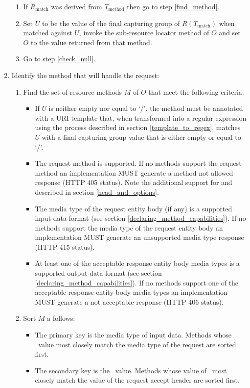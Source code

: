 \begin{enumerate}
\begin{enumerate}
\item If $R_{\mbox{match}}$ was derived from $T_{\mbox{method}}$ then go to step \ref{find_method}.

\item Set $U$ to be the value of the final capturing group of $R(T_{\mbox{match}})$ when matched against $U$,  invoke the sub-resource locator method of $O$ and set $O$ to the value returned from that method.

\item Go to step \ref{check_null}.

\end{enumerate}

\item \label{find_method} Identify the method that will handle the request:

\begin{enumerate}
\item Find the set of resource methods $M$ of $O$ that meet the following criteria:
\begin{itemize}
\item If $U$ is neither empty nor equal to \lq/\rq, the method must be annotated with  a URI template that, when transformed into a regular expression using the process described in section \ref{template_to_regex}, matches $U$ with a final capturing group value that is either empty or equal to \lq/\rq.
\item The request method is supported. If no methods support the request method an implementation MUST generate a method not allowed response (HTTP 405 status). Note the additional support for  and  described in section \ref{head_and_options}.
\item The media type of the request entity body (if any) is a supported input data format (see section \ref{declaring_method_capabilities}). If no methods support the media type of the request entity body an implementation MUST generate an unsupported media type response (HTTP 415 status).
\item At least one of the acceptable response entity body media types is a supported output data format (see section \ref{declaring_method_capabilities}). If no methods support one of the acceptable response entity body media types an implementation MUST generate a not acceptable response (HTTP 406 status).
\end{itemize} 
\item Sort $M$ a follows:
\begin{itemize}
\item The primary key is the media type of input data. Methods whose \ConsumeMime\ value most closely match the media type of the request are sorted first.
\item The secondary key is the \ProduceMime\ value. Methods whose value of \ProduceMime\ most closely match the value of the request accept header are sorted first.
\end{itemize}


\end{enumerate}
\end{enumerate}
